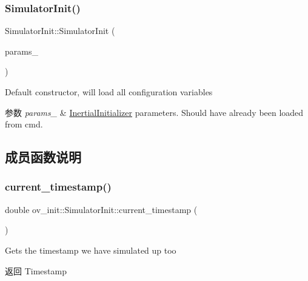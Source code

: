 \subsubsection{\texorpdfstring{Simulator\+Init()}{SimulatorInit()}}
{\footnotesize\ttfamily Simulator\+Init\+::\+Simulator\+Init (\begin{DoxyParamCaption}\item[{\hyperlink{structov__init_1_1InertialInitializerOptions}{Inertial\+Initializer\+Options} \&}]{params\+\_\+ }\end{DoxyParamCaption})}



Default constructor, will load all configuration variables 


\begin{DoxyParams}{参数}
{\em params\+\_\+} & \hyperlink{classov__init_1_1InertialInitializer}{Inertial\+Initializer} parameters. Should have already been loaded from cmd. \\
\hline
\end{DoxyParams}


\subsection{成员函数说明}
\mbox{\label{classov__init_1_1SimulatorInit_aca29b02e15f68526724d2dae56d2f756}} 
\subsubsection{\texorpdfstring{current\+\_\+timestamp()}{current\_timestamp()}}
{\footnotesize\ttfamily double ov\+\_\+init\+::\+Simulator\+Init\+::current\+\_\+timestamp (\begin{DoxyParamCaption}{ }\end{DoxyParamCaption})\hspace{0.3cm}{\ttfamily [inline]}}



Gets the timestamp we have simulated up too 

\begin{DoxyReturn}{返回}
Timestamp 
\end{DoxyReturn}
\mbox{\label{classov__init_1_1SimulatorInit_a352ee444f38cb6689e37ac83e30c7a68}} 
